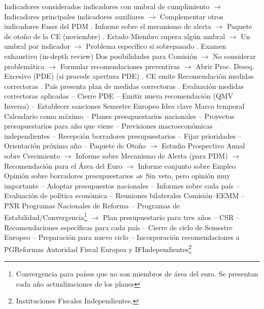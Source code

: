 \documentclass{nuevotema}
\begin{document}
\begin{esquemal}
				\4 Indicadores considerados
				 indicadores con umbral de cumplimiento
				\4[] $\to$ Indicadores principales
				 indicadores auxiliares
				\4[] $\to$ Complementar otros indicadores
				\4 Fases del PDM
				. Informe sobre el mecanismo de alerta
				\4[] $\to$ Paquete de otoño de la CE (noviembre)
				. Estado Miembro supera algún umbral
				\4[] $\to$ Un umbral por indicador
				\4[] $\to$ Problema específico si sobrepasado
				. Examen exhaustivo (in-depth review)
				\4[] \quad Dos posibilidades para Comisión
				\4[] \quad $\to$ No considerar problemática
				\4[] \quad $\to$ Formular recomendaciones preventivas
				\4[] \quad $\to$ Abrir Proc. Deseq. Excesivo (PDE)
				\4[] (si procede apertura PDE)
				. CE emite Recomendación medidas correctoras
				. País presenta plan de medidas correctoras
				. Evaluación medidas correctoras aplicadas
				\4[] \quad -- Cierre PDE
				\4[] \quad -- Emitir nueva recomendación (QMV Inversa)
				\4[] \quad -- Establecer sanciones
			\3 Semestre Europeo
				\4 Idea clave
				\4[] Marco temporal
				\4 Calendario
				\4[15 octubre] como máximo
				\4[] -- Planes presupuestarios nacionales
				\4[] -- Proyectos presupuestarios para año que viene
				\4[] -- Previsiones macroeconómicas independientes
				\4[Noviembre]
				\4[] -- Recepción borradores presupuestarios
				\4[] -- Fijar prioridades
				\4[] -- Orientación próximo año
				\4[] -- Paquete de Otoño
				\4[] $\to$ Estudio Prospectivo Anual sobre Crecimiento
				\4[] $\to$ Informe sobre Mecanismo de Alerta (para PDM)
				\4[] $\to$ Recomendación para el Área del Euro
				\4[] $\to$ Informe conjunto sobre Empleo
				\4[] Opinión sobre borradores presupuestarios
				\4[] $\Rightarrow$ Sin veto, pero opinión muy importante
				\4[31 de diciembre]
				\4[] -- Adoptar presupuestos nacionales
				\4[Febrero]
				\4[] -- Informes sobre cada país
				\4[] -- Evaluación de política económica
				\4[] -- Reuniones bilaterales Comisión--EEMM
				\4[] -- PNR Programas Nacionales de Reforma
				\4[] -- Programas de Estabilidad/Convergencia\footnote{Convergencia para países que no son miembros de área del euro. Se presentan cada año actualizaciones de los planes}
				\4[] $\to$ Plan presupuestario para tres años
				\4[] -- CSR -- Recomendaciones específicas para cada país
				\4[] -- Cierre de ciclo de Semestre Europeo
				\4[] -- Preparación para nuevo ciclo
				\4[] -- Incorporación recomendaciones a PGReformas
			\3 Autoridad Fiscal Europea y IFIndependientes\footnote{Instituciones Fiscales Independientes.}

\end{esquemal}
\end{document}
